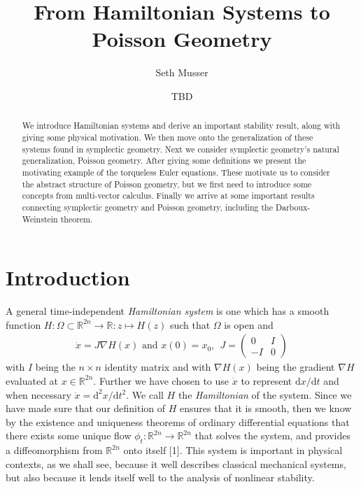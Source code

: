\documentclass[psamsfonts,12pt]{amsart}
\title{From Hamiltonian Systems to Poisson Geometry}
\author{Seth Musser}
\date{TBD}
\newcommand\td{\mathrm{d}}
\newcommand\0{\mathbf{0}}
\theoremstyle{plain}
\theoremstyle{definition}
\newcommand{\bbR}{\mathbb{R}}
\begin{document}
\begin{abstract}
We introduce Hamiltonian systems and derive an important stability result, along with giving some physical motivation.  We then move onto the generalization of these systems found in symplectic geometry.  Next we consider symplectic geometry's natural generalization, Poisson geometry.  After giving some definitions we present the motivating example of the torqueless Euler equations.  These motivate us to consider the abstract structure of Poisson geometry, but we first need to introduce some concepts from multi-vector calculus.  Finally we arrive at some important results connecting symplectic geometry and Poisson geometry, including the Darboux-Weinstein theorem.
\end{abstract}

\maketitle

\tableofcontents
{}

\section{Introduction}

A general time-independent \textit{Hamiltonian system} is one which has a smooth function $H\colon \Omega\subset \bbR^{2n} \rightarrow \bbR\colon z\mapsto H(z)$ such that $\Omega$ is open and
\begin{align}
\dot{x}=J\nabla H(x)\text{ and } x(0)=x_0, \ \ J=\begin{pmatrix} 0& I\\ -I& 0\end{pmatrix}
\end{align}
with $I$ being the $n\times n$ identity matrix and with $\nabla H(x)$ being the gradient $\nabla H$ evaluated at $x\in \bbR^{2n}$.  Further we have chosen to use $\dot{x}$ to represent $\td x/\td t$ and when necessary $\ddot{x}=\td^2 x/\td t^2$.  We call $H$ the \textit{Hamiltonian} of the system.  Since we have made sure that our definition of $H$ ensures that it is smooth, then we know by the existence and uniqueness theorems of ordinary differential equations that there exists some unique flow $\phi_t \colon \bbR^{2n}\rightarrow \bbR^{2n}$ that solves the system, and provides a diffeomorphism from $\bbR^{2n}$ onto itself [1].  This system is important in physical contexts, as we shall see, because it well describes classical mechanical systems, but also because it lends itself well to the analysis of nonlinear stability.
\end{document}
